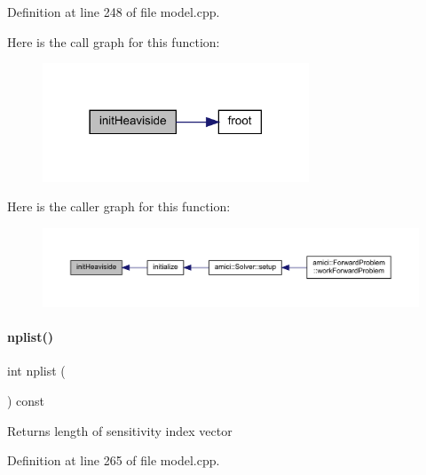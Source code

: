 Definition at line 248 of file model.\+cpp.

Here is the call graph for this function\+:
\nopagebreak
\begin{figure}[H]
\begin{center}
\leavevmode
\includegraphics[width=225pt]{classamici_1_1_model_afc1c1ffc33f397ed131f85c8321dd677_cgraph}
\end{center}
\end{figure}
Here is the caller graph for this function\+:
\nopagebreak
\begin{figure}[H]
\begin{center}
\leavevmode
\includegraphics[width=350pt]{classamici_1_1_model_afc1c1ffc33f397ed131f85c8321dd677_icgraph}
\end{center}
\end{figure}
\mbox{\label{classamici_1_1_model_a0f8e994055e37954d7746f3c1af27a5c}} 
\paragraph{\texorpdfstring{nplist()}{nplist()}}
{\footnotesize\ttfamily int nplist (\begin{DoxyParamCaption}{ }\end{DoxyParamCaption}) const}

\begin{DoxyReturn}{Returns}
length of sensitivity index vector 
\end{DoxyReturn}


Definition at line 265 of file model.\+cpp.

